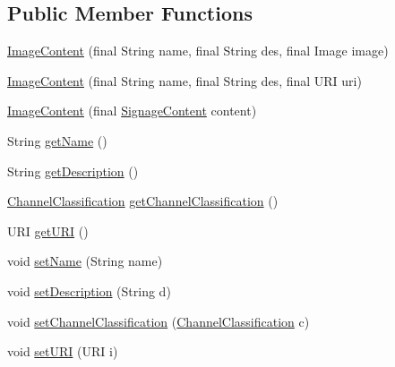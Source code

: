 \subsection*{Public Member Functions}
\begin{DoxyCompactItemize}
\item 
\hyperlink{classgov_1_1fnal_1_1ppd_1_1dd_1_1channel_1_1ImageContent_a1a73719e5c2318e10c1ff19a700f6b6b}{Image\-Content} (final String name, final String des, final Image image)
\item 
\hyperlink{classgov_1_1fnal_1_1ppd_1_1dd_1_1channel_1_1ImageContent_a2a1e9a063bfb42e2fb1d07a4e5b5683b}{Image\-Content} (final String name, final String des, final U\-R\-I uri)
\item 
\hyperlink{classgov_1_1fnal_1_1ppd_1_1dd_1_1channel_1_1ImageContent_a4fb6e6f283c165a9e2ed33295edd563c}{Image\-Content} (final \hyperlink{interfacegov_1_1fnal_1_1ppd_1_1dd_1_1signage_1_1SignageContent}{Signage\-Content} content)
\item 
String \hyperlink{classgov_1_1fnal_1_1ppd_1_1dd_1_1channel_1_1ImageContent_a855aebfe39e3ded135640617650fddaf}{get\-Name} ()
\item 
String \hyperlink{classgov_1_1fnal_1_1ppd_1_1dd_1_1channel_1_1ImageContent_aed5c1861d6d1da0f2da5b82184191e1b}{get\-Description} ()
\item 
\hyperlink{classgov_1_1fnal_1_1ppd_1_1dd_1_1changer_1_1ChannelClassification}{Channel\-Classification} \hyperlink{classgov_1_1fnal_1_1ppd_1_1dd_1_1channel_1_1ImageContent_a2d4a8fcd1f8c2bbea51d753e6e82510c}{get\-Channel\-Classification} ()
\item 
U\-R\-I \hyperlink{classgov_1_1fnal_1_1ppd_1_1dd_1_1channel_1_1ImageContent_a23961848cdf05cefb74d75ce49266443}{get\-U\-R\-I} ()
\item 
void \hyperlink{classgov_1_1fnal_1_1ppd_1_1dd_1_1channel_1_1ImageContent_aad2196606acfda8cdba44893f4767552}{set\-Name} (String name)
\item 
void \hyperlink{classgov_1_1fnal_1_1ppd_1_1dd_1_1channel_1_1ImageContent_a994cccf425e7905f06754dfb236971ed}{set\-Description} (String d)
\item 
void \hyperlink{classgov_1_1fnal_1_1ppd_1_1dd_1_1channel_1_1ImageContent_aa82db2fcb345593207808984b4de9ce8}{set\-Channel\-Classification} (\hyperlink{classgov_1_1fnal_1_1ppd_1_1dd_1_1changer_1_1ChannelClassification}{Channel\-Classification} c)
\item 
void \hyperlink{classgov_1_1fnal_1_1ppd_1_1dd_1_1channel_1_1ImageContent_a5390f4ad0482e2d2501126b73fc3d2f9}{set\-U\-R\-I} (U\-R\-I i)

\end{DoxyCompactItemize}
